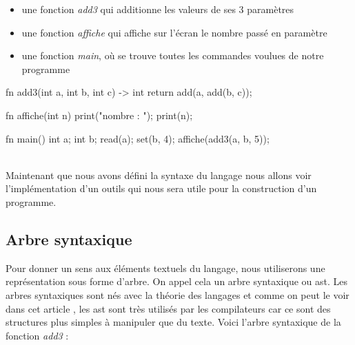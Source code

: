 \documentclass[a4paper]{article}%
\begin{document}
\begin{itemize}
  \item une fonction \textit{add3} qui additionne les valeurs de ses 3 paramètres\\
  \item une fonction \textit{affiche} qui affiche sur l'écran le nombre passé en paramètre\\
  \item une fonction \textit{main}, où se trouve toutes les commandes voulues de notre programme\\
\end{itemize}


\begin{grammar}[language=C++]
fn add3(int a, int b, int c) -> int {
    return add(a, add(b, c));
}

fn affiche(int n) {
    print("nombre : ");
    print(n);
}

fn main() {
    int a;
    int b;
    read(a);
    set(b, 4);
    affiche(add3(a, b, 5));
}
\end{grammar}\leavevmode\newline
~\\

Maintenant que nous avons défini la syntaxe du langage nous allons voir
l'implémentation d'un outils qui nous sera utile pour la construction d'un
programme.


\clearpage{}

\subsection{Arbre syntaxique}

Pour donner un sens aux éléments textuels du langage, nous utiliserons une
représentation sous forme d'arbre. On appel cela un arbre syntaxique ou
\gls{ast}. Les arbres syntaxiques sont nés avec la théorie des langages et comme
on peut le voir dans cet article \cite{compilerTICH}, les \gls{ast} sont très
utilisés par les compilateurs car ce sont des structures plus simples à
manipuler que du texte. Voici l'arbre syntaxique de la fonction \textit{add3} :
\end{document}
